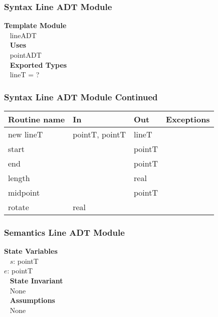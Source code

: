 \documentclass[t,12pt,numbers,fleqn,handout]{beamer}
\begin{document}

\begin{frame}
\frametitle{Syntax Line ADT Module}

\textbf{Template Module}\\
~\newline
lineADT\\
~\newline
\textbf{Uses}\\
~\newline
pointADT\\
~\newline
\textbf{Exported Types}\\
~\newline
lineT = ?

\end{frame}


\begin{frame}
\frametitle{Syntax Line ADT Module Continued}

\begin{tabular}{| l | l | l | l |}
\hline
\textbf{Routine name} & \textbf{In} & \textbf{Out} & \textbf{Exceptions}\\
\hline
new lineT & pointT, pointT & lineT & ~\\
\hline
start & ~ & pointT & ~\\
\hline
end & ~ & pointT & ~\\
\hline 
length & ~ & real & ~\\
\hline
midpoint & ~ & pointT & ~\\
\hline
rotate & real & ~ & ~\\
\hline
\end{tabular}

\end{frame}


\begin{frame}
\frametitle{Semantics Line ADT Module}

\textbf{State Variables}\\
~\newline
$s$: pointT\\
$e$: pointT\\
~\newline
\textbf {State Invariant}\\
~\newline
None\\
~\newline
\textbf{Assumptions}\\
~\newline
None

\end{frame}
\end{document}
